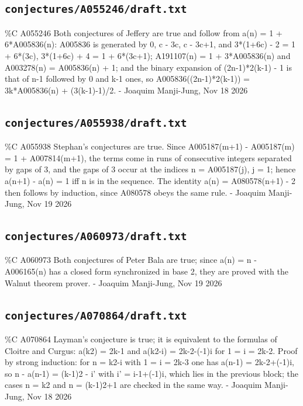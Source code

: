 \subsection*{\texttt{conjectures/A055246/draft.txt}}
{\small\raggedright\ttfamily
\%C A055246 Both conjectures of Jeffery are true and follow from a(n) = 1 + 6*A005836(n): A005836 is generated by 0, c - 3c, c - 3c+1, and 3*(1+6c) - 2 = 1 + 6*(3c), 3*(1+6c) + 4 = 1 + 6*(3c+1); A191107(n) = 1 + 3*A005836(n) and A003278(n) = A005836(n) + 1; and the binary expansion of (2n-1)*2(k-1) - 1 is that of n-1 followed by 0 and k-1 ones, so A005836((2n-1)*2(k-1)) = 3k*A005836(n) + (3(k-1)-1)/2. - Joaquim Manji-Jung, Nov 18 2026\par
}
\subsection*{\texttt{conjectures/A055938/draft.txt}}
{\small\raggedright\ttfamily
\%C A055938 Stephan's conjectures are true. Since A005187(m+1) - A005187(m) = 1 + A007814(m+1), the terms come in runs of consecutive integers separated by gaps of 3, and the gaps of 3 occur at the indices n = A005187(j), j = 1; hence a(n+1) - a(n) = 1 iff n is in the sequence. The identity a(n) = A080578(n+1) - 2 then follows by induction, since A080578 obeys the same rule. - Joaquim Manji-Jung, Nov 19 2026\par
}
\subsection*{\texttt{conjectures/A060973/draft.txt}}
{\small\raggedright\ttfamily
\%C A060973 Both conjectures of Peter Bala are true; since a(n) = n - A006165(n) has a closed form synchronized in base 2, they are proved with the Walnut theorem prover. - Joaquim Manji-Jung, Nov 19 2026\par
}
\subsection*{\texttt{conjectures/A070864/draft.txt}}
{\small\raggedright\ttfamily
\%C A070864 Layman's conjecture is true; it is equivalent to the formulas of Cloitre and Curgus: a(k2) = 2k-1 and a(k2-i) = 2k-2-(-1)i for 1 = i = 2k-2. Proof by strong induction: for n = k2-i with 1 = i = 2k-3 one has a(n-1) = 2k-2+(-1)i, so n - a(n-1) = (k-1)2 - i' with i' = i-1+(-1)i, which lies in the previous block; the cases n = k2 and n = (k-1)2+1 are checked in the same way. - Joaquim Manji-Jung, Nov 18 2026\par
}
